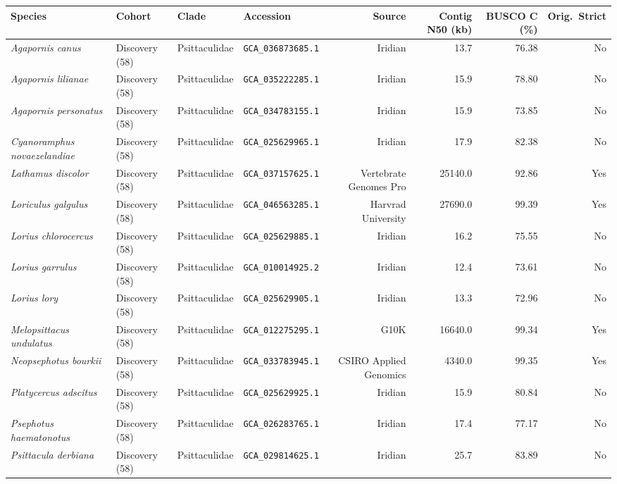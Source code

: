 \documentclass[9pt,a4paper]{article}
\begin{document}
\begin{longtable}{llllrrrr}
\toprule
\textbf{Species} & \textbf{Cohort} & \textbf{Clade} & \textbf{Accession} & \textbf{Source} & \textbf{Contig N50 (kb)} & \textbf{BUSCO C (\%)} & \textbf{Orig.\ Strict} \\
\midrule\endhead
\textit{Agapornis canus} & Discovery (58) & Psittaculidae & \texttt{GCA\_036873685.1} & Iridian & 13.7 & 76.38 & No \\
\textit{Agapornis lilianae} & Discovery (58) & Psittaculidae & \texttt{GCA\_035222285.1} & Iridian & 15.9 & 78.80 & No \\
\textit{Agapornis personatus} & Discovery (58) & Psittaculidae & \texttt{GCA\_034783155.1} & Iridian & 15.9 & 73.85 & No \\
\textit{Cyanoramphus novaezelandiae} & Discovery (58) & Psittaculidae & \texttt{GCA\_025629965.1} & Iridian & 17.9 & 82.38 & No \\
\textit{Lathamus discolor} & Discovery (58) & Psittaculidae & \texttt{GCA\_037157625.1} & Vertebrate Genomes Pro & 25140.0 & 92.86 & Yes \\
\textit{Loriculus galgulus} & Discovery (58) & Psittaculidae & \texttt{GCA\_046563285.1} & Harvrad University & 27690.0 & 99.39 & Yes \\
\textit{Lorius chlorocercus} & Discovery (58) & Psittaculidae & \texttt{GCA\_025629885.1} & Iridian & 16.2 & 75.55 & No \\
\textit{Lorius garrulus} & Discovery (58) & Psittaculidae & \texttt{GCA\_010014925.2} & Iridian & 12.4 & 73.61 & No \\
\textit{Lorius lory} & Discovery (58) & Psittaculidae & \texttt{GCA\_025629905.1} & Iridian & 13.3 & 72.96 & No \\
\textit{Melopsittacus undulatus} & Discovery (58) & Psittaculidae & \texttt{GCA\_012275295.1} & G10K & 16640.0 & 99.34 & Yes \\
\textit{Neopsephotus bourkii} & Discovery (58) & Psittaculidae & \texttt{GCA\_033783945.1} & CSIRO Applied Genomics & 4340.0 & 99.35 & Yes \\
\textit{Platycercus adscitus} & Discovery (58) & Psittaculidae & \texttt{GCA\_025629925.1} & Iridian & 15.9 & 80.84 & No \\
\textit{Psephotus haematonotus} & Discovery (58) & Psittaculidae & \texttt{GCA\_026283765.1} & Iridian & 17.4 & 77.17 & No \\
\textit{Psittacula derbiana} & Discovery (58) & Psittaculidae & \texttt{GCA\_029814625.1} & Iridian & 25.7 & 83.89 & No \\

\end{longtable}
\end{document}

